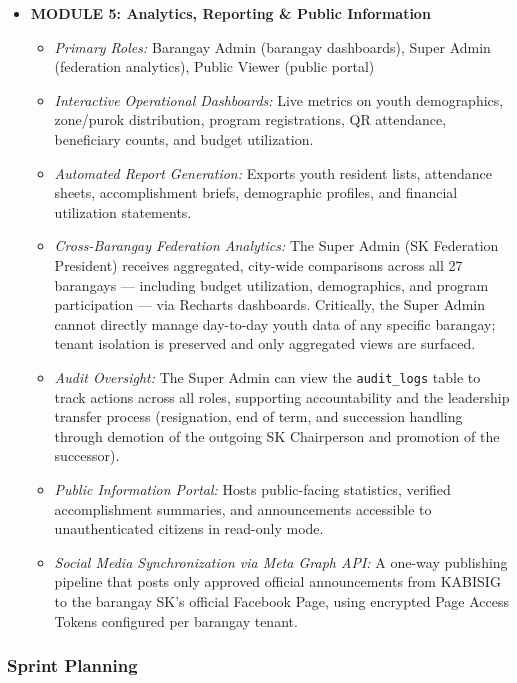 \begin{itemize}
\item \textbf{MODULE 5: Analytics, Reporting \& Public Information}
    \begin{itemize}
        \item \textit{Primary Roles:} Barangay Admin (barangay dashboards), Super Admin (federation analytics), Public Viewer (public portal)
        \item \textit{Interactive Operational Dashboards:} Live metrics on youth demographics, zone/purok distribution, program registrations, QR attendance, beneficiary counts, and budget utilization.
        \item \textit{Automated Report Generation:} Exports youth resident lists, attendance sheets, accomplishment briefs, demographic profiles, and financial utilization statements.
        \item \textit{Cross-Barangay Federation Analytics:} The Super Admin (SK Federation President) receives aggregated, city-wide comparisons across all 27 barangays --- including budget utilization, demographics, and program participation --- via Recharts dashboards. Critically, the Super Admin cannot directly manage day-to-day youth data of any specific barangay; tenant isolation is preserved and only aggregated views are surfaced.
        \item \textit{Audit Oversight:} The Super Admin can view the \texttt{audit\_logs} table to track actions across all roles, supporting accountability and the leadership transfer process (resignation, end of term, and succession handling through demotion of the outgoing SK Chairperson and promotion of the successor).
        \item \textit{Public Information Portal:} Hosts public-facing statistics, verified accomplishment summaries, and announcements accessible to unauthenticated citizens in read-only mode.
        \item \textit{Social Media Synchronization via Meta Graph API:} A one-way publishing pipeline that posts only approved official announcements from KABISIG to the barangay SK's official Facebook Page, using encrypted Page Access Tokens configured per barangay tenant.
    \end{itemize}
\end{itemize}
\vspace{5mm}

\subsubsection{Sprint Planning}
\label{subsubsec:sprint_planning}

